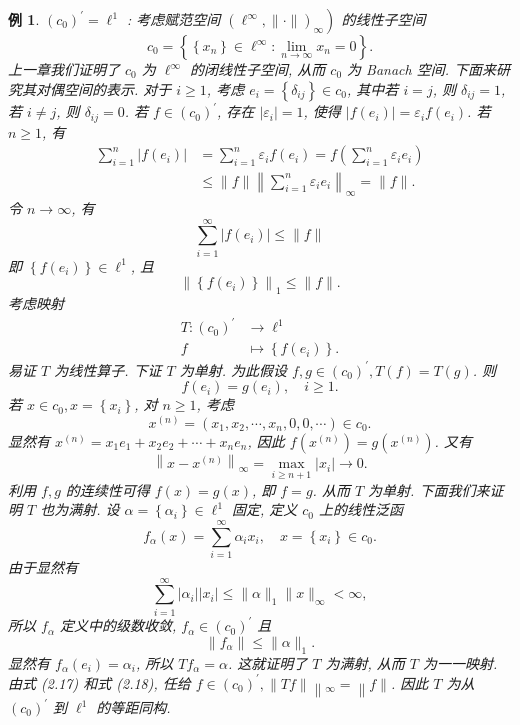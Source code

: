 \documentclass[openany]{ctexbook}
\theoremstyle{kaiti}
\theoremstyle{normal}
\newtheorem{example}{例}[section]
\begin{document}
\begin{example}
$\left(c_0\right)^{\prime}=\ell^1$ : 考虑赋范空间 $\left.\left(\ell^{\infty},\|\cdot\|\right)_{\infty}\right)$ 的线性子空间
$$
c_0=\left\{\left\{x_n\right\} \in \ell^{\infty}: \lim_{n \rightarrow \infty} x_n=0\right\}.
$$
上一章我们证明了 $c_0$ 为 $\ell^{\infty}$ 的闭线性子空间, 从而 $c_0$ 为 Banach 空间. 下面来研究其对偶空间的表示.
对于 $i \geqslant 1$, 考虑 $e_{i}=\left\{\delta_{i j}\right\} \in c_0$, 其中若 $i=j$, 则 $\delta_{i j}=1$, 若 $i \neq j$, 则 $\delta_{i j}=0$. 若 $f \in\left(c_0\right)^{\prime}$, 存在 $\left|\varepsilon_{i}\right|=1$, 使得 $\left|f\left(e_{i}\right)\right|=\varepsilon_{i} f\left(e_{i}\right)$. 若 $n \geqslant 1$, 有
$$
\begin{aligned}
\sum_{i=1}^n\left|f\left(e_{i}\right)\right| &=\sum_{i=1}^n \varepsilon_{i} f\left(e_{i}\right)=f\left(\sum_{i=1}^n \varepsilon_{i} e_{i}\right) \\
& \leqslant\|f\|\left\|\sum_{i=1}^n \varepsilon_{i} e_{i}\right\|_{\infty}=\|f\|.
\end{aligned}
$$
令 $n \rightarrow \infty$, 有
$$
\sum_{i=1}^{\infty}\left|f\left(e_{i}\right)\right| \leqslant\|f\|
$$
即 $\left\{f\left(e_{i}\right)\right\} \in \ell^1$, 且
\begin{equation}
  \left\|\left\{f\left(e_{i}\right)\right\}\right\|_1 \leqslant\|f\|.
\end{equation}
考虑映射
$$
\begin{aligned}
T:\left(c_0\right)^{\prime} & \rightarrow \ell^1 \\
f & \mapsto\left\{f\left(e_{i}\right)\right\}.
\end{aligned}
$$
易证 $T$ 为线性算子. 下证 $T$ 为单射. 为此假设 $f, g \in\left(c_0\right)^{\prime}, T(f)=T(g)$. 则
$$
f\left(e_{i}\right)=g\left(e_{i}\right), \quad i \geqslant 1.
$$
若 $x \in c_0, x=\left\{x_{i}\right\}$, 对 $n \geqslant 1$, 考虑
$$
x^{(n)}=\left(x_1, x_2, \cdots, x_n, 0,0, \cdots\right) \in c_0.
$$
显然有 $x^{(n)}=x_1 e_1+x_2 e_2+\cdots+x_n e_n$, 因此 $f\left(x^{(n)}\right)=g\left(x^{(n)}\right)$. 又有
$$
\left\|x-x^{(n)}\right\|_{\infty}=\max_{i \geqslant n+1}\left|x_{i}\right| \rightarrow 0.
$$
利用 $f, g$ 的连续性可得 $f(x)=g(x)$, 即 $f=g$. 从而 $T$ 为单射. 下面我们来证明 $T$ 也为满射. 设 $\alpha=\left\{\alpha_{i}\right\} \in \ell^1$ 固定, 定义 $c_0$ 上的线性泛函
$$
f_{\alpha}(x)=\sum_{i=1}^{\infty} \alpha_{i} x_{i}, \quad x=\left\{x_{i}\right\} \in c_0.
$$
由于显然有
$$
\sum_{i=1}^{\infty}\left|\alpha_{i}\right|\left|x_{i}\right| \leqslant\|\alpha\|_1\|x\|_{\infty}<\infty,
$$
所以 $f_{\alpha}$ 定义中的级数收敛, $f_{\alpha} \in\left(c_0\right)^{\prime}$ 且
\begin{equation}
  \left\|f_{\alpha}\right\| \leqslant\|\alpha\|_1.
\end{equation}
显然有 $f_{\alpha}\left(e_{i}\right)=\alpha_{i}$, 所以 $T f_{\alpha}=\alpha$. 这就证明了 $T$ 为满射, 从而 $T$ 为一一映射. 由式 (2.17) 和式 (2.18), 任给 $f \in\left(c_0\right)^{\prime},\|T f\|\left\|_{\infty}=\right\| f \|$. 因此 $T$ 为从 $\left(c_0\right)^{\prime}$ 到 $\ell^1$ 的等距同构.
\end{example}
\end{document}
